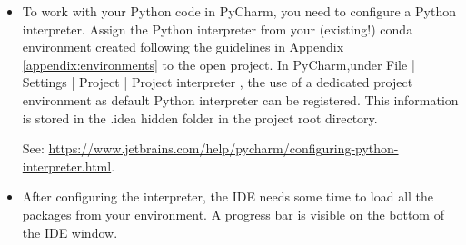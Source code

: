 \begin{itemize}
	\item To work with your Python code in PyCharm, you need to configure a Python interpreter. Assign the Python interpreter from your (existing!) \textsf{conda} environment created following the guidelines in Appendix \ref{appendix:environments} to the open project. In PyCharm,under File | Settings | Project | Project interpreter , the use of a dedicated project environment as default Python interpreter can be registered. This information is stored in the \textsf{.idea} hidden folder in the project root directory.
	
	See: \url{https://www.jetbrains.com/help/pycharm/configuring-python-interpreter.html}.
	
	\item After configuring the interpreter, the IDE needs some time to load all the packages from your environment. A progress bar is visible on the bottom of the IDE window.
\end{itemize}

